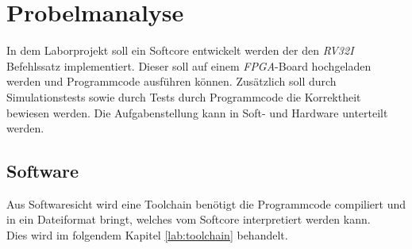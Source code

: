 \chapter{Probelmanalyse}

    In dem Laborprojekt soll ein Softcore entwickelt werden der den \textit{RV32I} Befehlssatz implementiert.
    Dieser soll auf einem \textit{FPGA}-Board hochgeladen werden und Programmcode ausführen können.
    Zusätzlich soll durch Simulationstests sowie durch Tests durch Programmcode die Korrektheit
    bewiesen werden.
    Die Aufgabenstellung kann in Soft- und Hardware unterteilt werden.

        \section{Software}
            Aus Softwaresicht wird eine Toolchain benötigt die Programmcode compiliert
            und in ein Dateiformat bringt, welches vom Softcore interpretiert werden kann.
            \\
            Dies wird im folgendem Kapitel \ref{lab:toolchain} behandelt.

